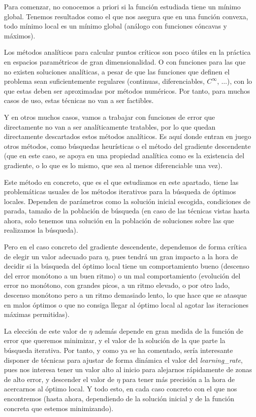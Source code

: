\documentclass[11pt]{article}
\begin{document}
Para comenzar, no conocemos a priori si la función estudiada tiene un mínimo global. Tenemos resultados como el que nos asegura que en una función convexa, todo mínimo local es un mínimo global (análogo con funciones cóncavas y máximos).

Los métodos analíticos para calcular puntos críticos son poco útiles en la práctica en espacios paramétricos de gran dimensionalidad. O con funciones para las que no existen soluciones analíticas, a pesar de que las funciones que definen el problema sean suficientemente regulares (continuas, diferenciables, $C^\infty$, $\ldots$), con lo que estas deben ser aproximadas por métodos numéricos. Por tanto, para muchos casos de uso, estas técnicas no van a ser factibles.

Y en otros muchos casos, vamos a trabajar con funciones de error que directamente no van a ser analíticamente tratables, por lo que quedan directamente descartados estos métodos analíticos. Es aquí donde entran en juego otros métodos, como búsquedas heurísticas o el método del gradiente descendente (que en este caso, se apoya en una propiedad analítica como es la existencia del gradiente, o lo que es lo mismo, que sea al menos diferenciable una vez).

Este método en concreto, que es el que estudiamos en este apartado, tiene las problemáticas usuales de los métodos iterativos para la búsqueda de óptimos locales. Dependen de parámetros como la solución inicial escogida, condiciones de parada, tamaño de la población de búsqueda (en caso de las técnicas vistas hasta ahora, solo tenemos una solución en la población de soluciones sobre las que realizamos la búsqueda).

Pero en el caso concreto del gradiente descendente, dependemos de forma crítica de elegir un valor adecuado para $\eta$, pues tendrá un gran impacto a la hora de decidir si la búsqueda del óptimo local tiene un comportamiento bueno (descenso del error monótono a un buen ritmo) o un mal comportamiento (evolución del error no monótono, con grandes picos, a un ritmo elevado, o por otro lado, descenso monótono pero a un ritmo demasiado lento, lo que hace que se atasque en malos óptimos o que no consiga llegar al óptimo local al agotar las iteraciones máximas permitidas).

La elección de este valor de $\eta$ además depende en gran medida de la función de error que queremos minimizar, y el valor de la solución de la que parte la búsqueda iterativa. Por tanto, y como ya se ha comentado, sería interesante disponer de técnicas para ajustar de forma dinámica el valor del \emph{learning\_rate}, pues nos interesa tener un valor alto al inicio para alejarnos rápidamente de zonas de alto error, y descender el valor de $\eta$ para tener más precisión a la hora de acercarnos al óptimo local. Y todo esto, en cada caso concreto con el que nos encontremos (hasta ahora, dependiendo de la solución inicial y de la función concreta que estemos minimizando).
\end{document}
